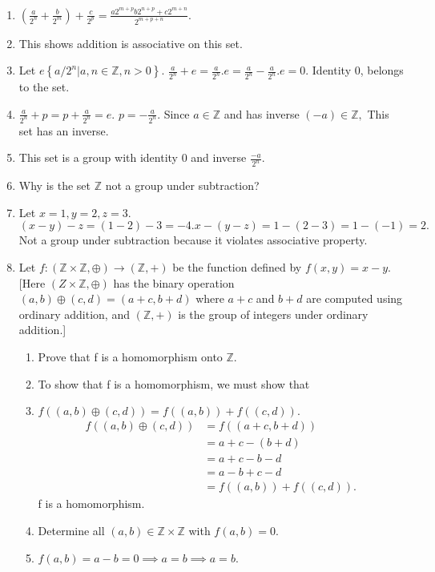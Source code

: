 \documentclass[letterpaper,11pt]{article}
\begin{document}
\begin{enumerate}
    \item[] $(\frac{a}{2^n} + \frac{b}{2^m}) + \frac{c}{2^p} = \frac{a2^{m+p}b2^{n+p}+c2^{m+n}}{2^{m+p+n}}$.
    \item[] This shows addition is associative on this set.
    \item[] Let $e \left\{a/2^n|a, n \in \mathbb{Z}, n>0\right\}.$ $\frac{a}{2^n} + e = \frac{a}{2^n}. e = \frac{a}{2^n} - \frac{a}{2^n}. e = 0.$ Identity 0, belongs to the set.
    \item[] $\frac{a}{2^n} + p = p + \frac{a}{2^n} = e.$ $p = -\frac{a}{2^n}$. Since $a \in \mathbb{Z}$ and has inverse $(-a) \in \mathbb{Z},$ This set has an inverse. 
    \item[] This set is a group with identity 0 and inverse $\frac{-a}{2^n}.$
    \newpage
    \item Why is the set $\mathbb{Z}$ not a group under subtraction?
    \item [] Let $x=1,y=2,z=3.$ $(x-y)-z = (1-2)-3 = -4. x-(y-z) = 1-(2-3) = 1 - (-1) = 2.$ Not a group under subtraction because it violates associative property.
    \item Let $f : (\mathbb{Z} \times \mathbb{Z}, \oplus) \rightarrow (\mathbb{Z}, +)$ be the function defined by $f(x, y) = x - y$. [Here $(Z \times \mathbb{Z}, \oplus)$ has the binary operation $(a, b) \oplus (c, d) = (a+c, b+d)$ where $a+c$ and $b+d$ are computed using ordinary addition, and $(\mathbb{Z}, +)$ is the group of integers under ordinary addition.]
    \begin{enumerate}
        \item Prove that f is a homomorphism onto $\mathbb{Z}$.
        \item [] To show that f is a homomorphism, we must show that 
        \item[] $f((a,b)\oplus(c,d))=f((a,b))+f((c,d)).$
        \begin{align}
            f((a,b)\oplus(c,d)) & = f((a+c,b+d)) \\
            & =a+c-(b+d) \\
            & =a+c-b-d \\
            & =a-b+c-d \\
            & =f((a,b))+f((c,d)).    
        \end{align}
        f is a homomorphism. 
        \item Determine all $(a, b) \in \mathbb{Z} \times \mathbb{Z}$ with $f(a, b) = 0$.
        \item [] $f(a,b) = a-b = 0 \implies a = b \implies a = b.$

\end{enumerate}
\end{enumerate}
\end{document}
